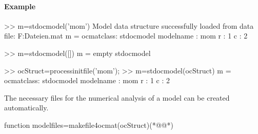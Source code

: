\paragraph{Example}
\begin{matlab}
>> m=stdocmodel('mom')
Model data structure successfully loaded from data file:
F:\home\dieter\Eigene Dateien\Matlab\toolbox\numtools\ocmatnew\model\usermodel\mom\data\momModelDataStructure.mat
m =
ocmatclass: stdocmodel
    modelname : mom
    r : 1
    c : 2
		
>> m=stdocmodel([])
m =
empty stdocmodel

>> ocStruct=processinitfile('mom');
>> m=stdocmodel(ocStruct)
m =
ocmatclass: stdocmodel
    modelname : mom
    r : 1
    c : 2
\end{matlab}
The necessary files for the numerical analysis of a model can be created automatically.
\begin{matlab}
function modelfiles=makefile4ocmat(ocStruct)(*@@*)
%
%
%
\end{matlab}
